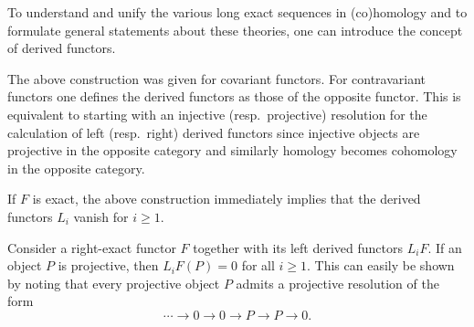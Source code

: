 	To understand and unify the various long exact sequences in (co)homology and to formulate general statements about these theories, one can introduce the concept of derived functors.

	\begin{remark}
        The above construction was given for covariant functors. For contravariant functors one defines the derived functors as those of the opposite functor. This is equivalent to starting with an injective (resp.~projective) resolution for the calculation of left (resp.~right) derived functors since injective objects are projective in the opposite category and similarly homology becomes cohomology in the opposite category.
    \end{remark}

	\begin{property}\label{homalg:exact_vanishing_derived_functor}
		If $F$ is exact, the above construction immediately implies that the derived functors $L_i$ vanish for $i\geq 1$.
	\end{property}

	\begin{property}\label{homalg:projective_object}
		Consider a right-exact functor $F$ together with its left derived functors $L_iF$. If an object $P$ is projective, then $L_iF(P)=0$ for all $i\geq1$. This can easily be shown by noting that every projective object $P$ admits a projective resolution of the form \[\cdots\longrightarrow0\longrightarrow0\longrightarrow P\longrightarrow P\longrightarrow0.\]
	\end{property}

